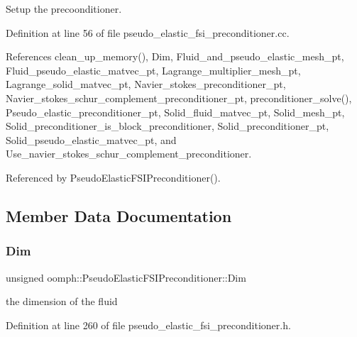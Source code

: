 Setup the precoonditioner. 



Definition at line 56 of file pseudo\+\_\+elastic\+\_\+fsi\+\_\+preconditioner.\+cc.



References clean\+\_\+up\+\_\+memory(), Dim, Fluid\+\_\+and\+\_\+pseudo\+\_\+elastic\+\_\+mesh\+\_\+pt, Fluid\+\_\+pseudo\+\_\+elastic\+\_\+matvec\+\_\+pt, Lagrange\+\_\+multiplier\+\_\+mesh\+\_\+pt, Lagrange\+\_\+solid\+\_\+matvec\+\_\+pt, Navier\+\_\+stokes\+\_\+preconditioner\+\_\+pt, Navier\+\_\+stokes\+\_\+schur\+\_\+complement\+\_\+preconditioner\+\_\+pt, preconditioner\+\_\+solve(), Pseudo\+\_\+elastic\+\_\+preconditioner\+\_\+pt, Solid\+\_\+fluid\+\_\+matvec\+\_\+pt, Solid\+\_\+mesh\+\_\+pt, Solid\+\_\+preconditioner\+\_\+is\+\_\+block\+\_\+preconditioner, Solid\+\_\+preconditioner\+\_\+pt, Solid\+\_\+pseudo\+\_\+elastic\+\_\+matvec\+\_\+pt, and Use\+\_\+navier\+\_\+stokes\+\_\+schur\+\_\+complement\+\_\+preconditioner.



Referenced by Pseudo\+Elastic\+F\+S\+I\+Preconditioner().



\subsection{Member Data Documentation}
\mbox{\label{classoomph_1_1PseudoElasticFSIPreconditioner_aec1e28a3a746a76ed6a283115e8d3146}} 
\subsubsection{\texorpdfstring{Dim}{Dim}}
{\footnotesize\ttfamily unsigned oomph\+::\+Pseudo\+Elastic\+F\+S\+I\+Preconditioner\+::\+Dim\hspace{0.3cm}{\ttfamily [private]}}



the dimension of the fluid 



Definition at line 260 of file pseudo\+\_\+elastic\+\_\+fsi\+\_\+preconditioner.\+h.



